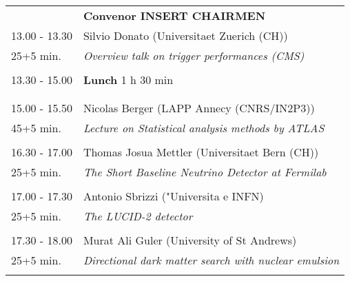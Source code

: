\begin{longtable}{p{3cm}p{13cm}}
&\hfill {\bf Convenor INSERT CHAIRMEN }\\ 
13.00 - 13.30 & Silvio Donato (Universitaet Zuerich (CH))\\ 
25+5 min. & {\it Overview talk on trigger performances (CMS)}\\ 
 & \\ 
13.30 - 15.00 & {\bf Lunch} \hfill 1 h 30 min \\ 
 & \\ 
 & \\ 
15.00 - 15.50 & Nicolas Berger (LAPP Annecy (CNRS/IN2P3))\\ 
45+5 min. & {\it Lecture on Statistical analysis methods by ATLAS}\\ 
 & \\ 
16.30 - 17.00 & Thomas Josua Mettler (Universitaet Bern (CH))\\ 
25+5 min. & {\it The Short Baseline Neutrino Detector at Fermilab}\\ 
 & \\ 
17.00 - 17.30 & Antonio Sbrizzi ("Universita e INFN)\\ 
25+5 min. & {\it The LUCID-2 detector}\\ 
 & \\ 
17.30 - 18.00 & Murat Ali Guler (University of St Andrews)\\ 
25+5 min. & {\it Directional dark matter search with nuclear emulsion}\\ 
 & \\ 
\end{longtable}

